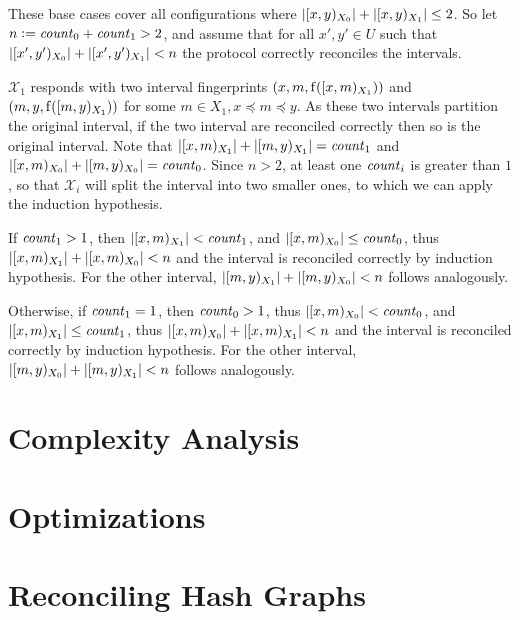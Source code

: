 These base cases cover all configurations where $|{[{x},{y})_{X_0}}| + |{[{x},{y})_{X_1}}| \leq 2$.
So let $n \vcentcolon= \mathit{count}_{0} + \mathit{count}_{1} > 2$, and assume that for all $x', y' \in U$ such that $|{[{x'},{y'})_{X_0}}| + |{[{x'},{y'})_{X_1}}| < n$ the protocol correctly reconciles the intervals.

$\mathcal{X}_1$ responds with two interval fingerprints $({x}, {m}, {\operatorname{f}([{x},{m})_{X_1})})$ and $({m}, {y}, {\operatorname{f}([{m},{y})_{X_1})})$ for some $m \in X_1, x \preceq m \preceq y$.
As these two intervals partition the original interval, if the two interval are reconciled correctly then so is the original interval.
Note that $|{[{x},{m})_{X_1}}| + |{[{m},{y})_{X_1}}| = \mathit{count}_{1}$ and $|{[{x},{m})_{X_0}}| + |{[{m},{y})_{X_0}}| = \mathit{count}_{0}$. Since $n > 2$, at least one $\mathit{count}_{i}$ is greater than $1$, so that $\mathcal{X}_i$ will split the interval into two smaller ones, to which we can apply the induction hypothesis.

\begin{caselist}
\case If $\mathit{count}_{1} > 1$, then $|{[{x},{m})_{X_1}}| < \mathit{count}_{1}$, and $|{[{x},{m})_{X_0}}| \leq \mathit{count}_{0}$, thus $|{[{x},{m})_{X_1}}| + |{[{x},{m})_{X_0}}| < n$ and the interval is reconciled correctly by induction hypothesis. For the other interval, $|{[{m},{y})_{X_1}}| + |{[{m},{y})_{X_0}}| < n$ follows analogously.

\case Otherwise, if $\mathit{count}_{1} = 1$, then $\mathit{count}_{0} > 1$, thus $|{[{x},{m})_{X_0}}| < \mathit{count}_{0}$, and $|{[{x},{m})_{X_1}}| \leq \mathit{count}_{1}$, thus $|{[{x},{m})_{X_0}}| + |{[{x},{m})_{X_1}}| < n$ and the interval is reconciled correctly by induction hypothesis. For the other interval, $|{[{m},{y})_{X_0}}| + |{[{m},{y})_{X_1}}| < n$ follows analogously.
\end{caselist} 

\section{Complexity Analysis}
\label{set-reconciliation-simple-complexity}




\section{Optimizations}
\label{set-reconciliation-simple-optimizations}





\section{Reconciling Hash Graphs}
\label{set-reconciliation-simple-graphs}
